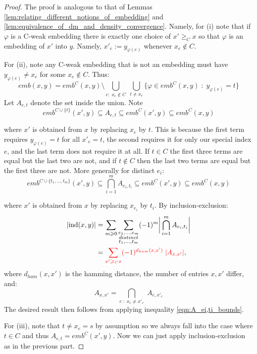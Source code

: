 \documentclass[11pt,oneside,reqno]{article}
\theoremstyle{plain}
\theoremstyle{definition}
\numberwithin{equation}{section}
\renewcommand{\geq}{\geqslant}
\renewcommand{\phi}{\varphi}
\newcommand{\induced}{\text{ind}}
\newcommand{\red}{\textcolor{red}}
\begin{document}
\begin{proof}
    The proof is analogous to that of Lemmas \ref{lem:relating_different_notions_of_embedding} and \ref{lem:equivalence_of_dm_and_density_convergence}. Namely, for (i) note that if $\phi$ is a C-weak embedding there is exactly one choice of $x' \geq_C x$ so that $\phi$ is an embedding of $x'$ into $y$. Namely, $x'_e := y_{\phi(e)}$ whenever $x_e \notin C$. 

    For (ii), note any C-weak embedding that is not an embedding must have $y_{\phi(e)} \neq x_e$ for some $x_e \notin C$. Thus:
    \[emb(x,y) = emb^C(x,y) \setminus \bigcup_{e : \; x_e \notin C} \; \bigcup_{t \neq x_e} \{ \phi \in emb^C(x,y) \; : \; y_{\phi(e)} = t \}\]
    \noindent Let $A_{e,t}$ denote the set inside the union. Note
        \[emb^{C \cup \{t\}}(x',y) \subseteq A_{e,t} \subseteq  emb^C(x',y) \subseteq emb^C(x,y)\]

        \noindent where $x'$ is obtained from $x$ by replacing $x_e$ by $t$. This is because the first term requires $y_{\phi(e)} = t$ for all $x'_e = t$, the second requires it for only our special index $e$, and the last term does not require it at all. If $t \in C$ the first three terms are equal but the last two are not, and if $t \notin C$ then the last two terms are equal but the first three are not. More generally for distinct $e_i$: 
        \begin{equation}
                emb^{C \cup \{t_1, ..., t_m\}}(x',y) \subseteq \bigcap_{i=1}^m A_{e_i, t_i} \subseteq emb^C(x',y) \subseteq emb^C(x,y)
                \label{eqn:A_ei,ti_bounds}
        \end{equation}
 
        \noindent where $x'$ is obtained from $x$ by replacing $x_{e_i}$ by $t_i$.  By inclusion-exclusion:
    \begin{align*}
        |\induced(x,y)| & = \sum_{m \geq 0}\sum_{\substack{e_1,..., e_m \\ distinct \\ t_1,..., t_m}} (-1)^m\bigg| \bigcap_{i=1}^m A_{e_i, t_i} \bigg| \\
        & = \red{\sum_{x' \geq_C x} (-1)^{d_{ham}(x,x')} \; |A_{x,x'}|}, 
    \end{align*}
%
    \noindent where $d_{ham}(x,x')$ is the hamming distance, the number of entries $x,x'$ differ, and:
    \[A_{x,x'} = \bigcap_{e \; : \; x_e \neq x'_e} \; A_{e, x'_e}\]
    The desired result then follows from applying inequality \eqref{eqn:A_ei,ti_bounds}.
    
    For (iii), note that $t \neq x_e = s$ by assumption so we always fall into the case where $t \in C$ and thus $A_{e,t} = emb^C(x',y )$. Now we can just apply inclusion-exclusion as in the previous part.
\end{proof}
\end{document}
